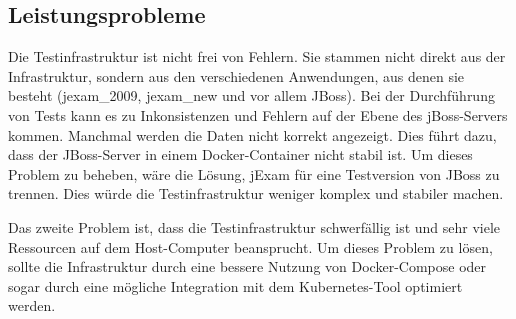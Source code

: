 \subsection{Leistungsprobleme}

Die Testinfrastruktur ist nicht frei von Fehlern. Sie stammen nicht
direkt aus der Infrastruktur, sondern aus den verschiedenen
Anwendungen, aus denen sie besteht (\Gls{jexam_2009}, \Gls{jexam_new} und vor
allem JBoss). Bei der Durchführung von Tests kann es zu Inkonsistenzen
und Fehlern auf der Ebene des jBoss-Servers kommen. Manchmal werden
die Daten nicht korrekt angezeigt. Dies führt dazu, dass der
JBoss-Server in einem Docker-Container nicht stabil ist. Um dieses
Problem zu beheben, wäre die Lösung, jExam für eine Testversion von
JBoss zu trennen. Dies würde die Testinfrastruktur weniger komplex
und stabiler machen.

Das zweite Problem ist, dass die Testinfrastruktur schwerfällig ist
und sehr viele Ressourcen auf dem Host-Computer beansprucht. Um dieses
Problem zu lösen, sollte die Infrastruktur durch eine bessere Nutzung
von Docker-Compose oder sogar durch eine mögliche Integration mit dem
Kubernetes-Tool optimiert werden.

